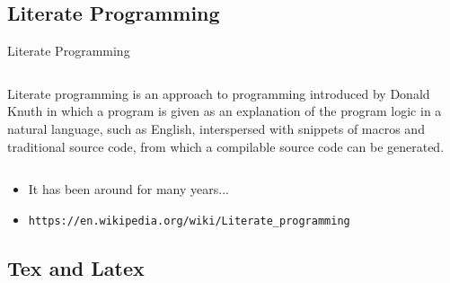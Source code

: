 \documentclass{beamer}
\begin{document}

\subsection[Literate Programming]{Literate Programming}

\begin{frame}{Literate Programming}
	\begin{center}
	\begin{columns}
	\begin{block}{}
	\begin{center}
	Literate programming is an approach to programming introduced by Donald Knuth in which a program is given as an explanation of the program logic in a natural language, such as English, interspersed with snippets of macros and traditional source code, from which a compilable source code can be generated.
	\end{center}
	\end{block}
	\end{columns}
	\end{center}
	
      \begin{itemize}
	\item It has been around for many years...
	\item \texttt{https://en.wikipedia.org/wiki/Literate\_programming}
      \end{itemize}
\end{frame}


\subsection[Latex]{Tex and Latex}

\end{document}
